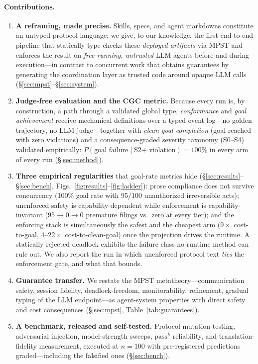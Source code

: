 \documentclass{article}
\begin{document}
\paragraph{Contributions.}
\begin{enumerate}\itemsep2pt
\item \textbf{A reframing, made precise.} Skills, specs, and agent markdowns constitute an untyped protocol language; we give, to our knowledge, the first end-to-end pipeline that statically type-checks these \emph{deployed artifacts} via MPST and enforces the result on \emph{free-running, untrusted} LLM agents before and during execution---in contrast to concurrent work that obtains guarantees by generating the coordination layer as trusted code around opaque LLM calls \citep{bollig26} (\S\ref{sec:mpst}--\S\ref{sec:system}).
\item \textbf{Judge-free evaluation and the CGC metric.} Because every run is, by construction, a path through a validated global type, \emph{conformance} and \emph{goal achievement} receive mechanical definitions over a typed event log---no golden trajectory, no LLM judge---together with \emph{clean-goal completion} (goal reached with zero violations) and a consequence-graded severity taxonomy (S0--S4) validated empirically: $P(\text{goal failure}\mid\text{S2+ violation})=100\%$ in every arm of every run (\S\ref{sec:method}).
\item \textbf{Three empirical regularities} that goal-rate metrics hide (\S\ref{sec:results}--\S\ref{sec:bench}, Figs.~\ref{fig:results}--\ref{fig:ladder}): prose compliance does not survive concurrency (100\% goal rate with 95/100 unauthorized irreversible acts); unenforced safety is capability-dependent while enforcement is capability-invariant (95$\to$0$\to$0 premature filings vs.\ zero at every tier); and the enforcing stack is simultaneously the safest and the cheapest arm ($9\times$ cost-to-goal, $4$--$22\times$ cost-to-clean-goal) once the projection drives the runtime. A statically rejected deadlock exhibits the failure class no runtime method can rule out. We also report the run in which unenforced protocol text \emph{ties} the enforcement gate, and what that bounds.
\item \textbf{Guarantee transfer.} We restate the MPST metatheory---communication safety, session fidelity, deadlock-freedom, monitorability, refinement, gradual typing of the LLM endpoint---as agent-system properties with direct safety and cost consequences (\S\ref{sec:mpst}, Table~\ref{tab:guarantees}).
\item \textbf{A benchmark, released and self-tested.} Protocol-mutation testing, adversarial injection, model-strength sweeps, $\mathrm{pass}^k$ reliability, and translation-fidelity measurement, executed at $n{=}100$ with pre-registered predictions graded---including the falsified ones (\S\ref{sec:bench}).
\end{enumerate}
\end{document}
